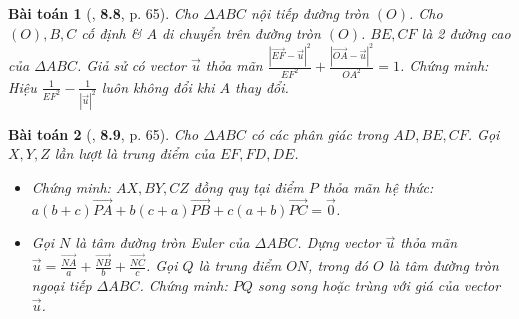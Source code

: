 \documentclass{article}
\numberwithin{equation}{section}
\newtheorem{baitoan}{Bài toán}[section]
\begin{document}
\begin{baitoan}[\cite{Hai_Hung_Thu_Tung2022_tap_1}, \textbf{8.8}, p. 65]
	Cho $\Delta ABC$ nội tiếp đường tròn $(O)$. Cho $(O),B,C$ cố định \& $A$ di chuyển trên đường tròn $(O)$. $BE,CF$ là 2 đường cao của $\Delta ABC$. Giả sử có vector $\vec{u}$ thỏa mãn $\frac{|\overrightarrow{EF} - \vec{u}|^2}{EF^2} + \frac{|\overrightarrow{OA} - \vec{u}|^2}{OA^2} = 1$. Chứng minh: Hiệu $\frac{1}{EF^2} - \frac{1}{|\vec{u}|^2}$ luôn không đổi khi $A$ thay đổi.
\end{baitoan}

\begin{baitoan}[\cite{Hai_Hung_Thu_Tung2022_tap_1}, \textbf{8.9}, p. 65]
	Cho $\Delta ABC$ có các phân giác trong $AD,BE,CF$. Gọi $X,Y,Z$ lần lượt là trung điểm của $EF,FD,DE$.
	\begin{itemize}
		\item[(a)] Chứng minh: $AX,BY,CZ$ đồng quy tại điểm $P$ thỏa mãn hệ thức: $a(b + c)\overrightarrow{PA} + b(c + a)\overrightarrow{PB} + c(a + b)\overrightarrow{PC} = \vec{0}$.
		\item[(b)] Gọi $N$ là tâm đường tròn Euler của $\Delta ABC$. Dựng vector $\vec{u}$ thỏa mãn $\vec{u} = \frac{\overrightarrow{NA}}{a} + \frac{\overrightarrow{NB}}{b} + \frac{\overrightarrow{NC}}{c}$. Gọi $Q$ là trung điểm $ON$, trong đó $O$ là tâm đường tròn ngoại tiếp $\Delta ABC$. Chứng minh: $PQ$ song song hoặc trùng với giá của vector $\vec{u}$.
	\end{itemize}
\end{baitoan}


\printbibliography[heading=bibintoc]
	
\end{document}

